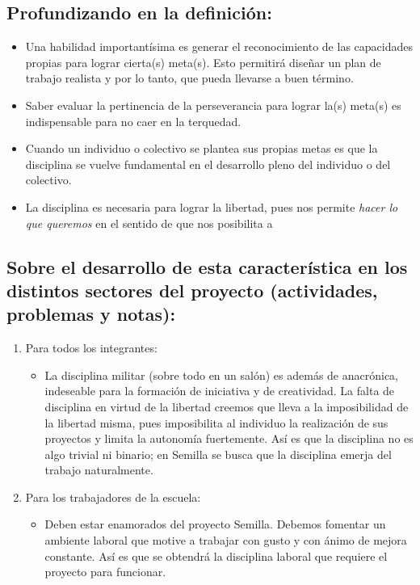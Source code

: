 \documentclass[10pt,letterpaper,oneside]{book}
\begin{document}
		\subsection*{Profundizando en la definición:} 
		\begin{itemize}
		\item Una habilidad importantísima es generar el reconocimiento de las capacidades propias para lograr cierta(s) meta(s). Esto permitirá diseñar un plan de trabajo realista y por lo tanto, que pueda llevarse a buen término.
		\item Saber evaluar la pertinencia de la perseverancia para lograr la(s) meta(s) es indispensable para no caer en la terquedad.
		\item Cuando un individuo o colectivo se plantea sus propias metas es que la disciplina se vuelve fundamental en el desarrollo pleno del individuo o del colectivo.
		\item La disciplina es necesaria para lograr la libertad, pues nos permite \emph{hacer lo que queremos} en el sentido de que nos posibilita a 
		\end{itemize}


		\subsection*{Sobre el desarrollo de esta característica en los distintos sectores del proyecto (actividades, problemas y notas):}
			\begin{enumerate}[label=\Alph*]
			\item Para todos los integrantes:
			\begin{itemize}
					\item La disciplina militar (sobre todo en un salón) es además de anacrónica, indeseable para la formación de iniciativa y de creatividad. La falta de disciplina en virtud de la libertad creemos que lleva a la imposibilidad de la libertad misma, pues imposibilita al individuo la realización de sus proyectos y limita la autonomía fuertemente. Así es que la disciplina no es algo trivial ni binario; en Semilla se busca que la disciplina emerja del trabajo naturalmente.
			\end{itemize}
			\item Para los trabajadores de la escuela:
			\begin{itemize}
			\item Deben estar enamorados del proyecto Semilla. Debemos fomentar un ambiente laboral que motive a trabajar con gusto y con ánimo de mejora constante. Así es que se obtendrá la disciplina laboral que requiere el proyecto para funcionar.
			\end{itemize}
			\end{enumerate}
\end{document}
